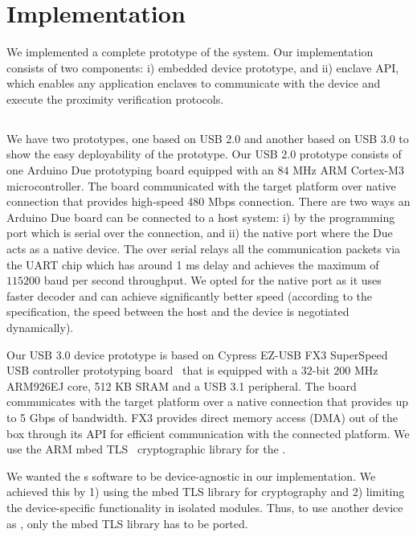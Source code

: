 \section{Implementation}
\label{sec:implementation}

We implemented a complete prototype of the \name system. Our implementation consists of two components: i) \device embedded device prototype, and ii) \name enclave API, which enables any application enclaves to communicate with the \device device and execute the proximity verification protocols.

\subsection{\device}

We have two prototypes, one based on USB 2.0 and another based on USB 3.0 to show the easy deployability of the prototype. Our USB 2.0 \device prototype consists of one Arduino Due prototyping board equipped with an $84$ MHz ARM Cortex-M3 microcontroller. The board communicated with the target platform over native  connection that provides high-speed 480 Mbps connection. There are two ways an Arduino Due board can be connected to a host system: i) by the programming port which is serial over the \usb connection, and ii) the native \usb port where the Due acts as a native \usb device. The \usb over serial relays all the communication packets via the UART chip which has around 1 ms delay and achieves the maximum of $115200$ baud per second throughput. We opted for the native \usb port as it uses faster  decoder and can achieve significantly better speed (according to the \usb specification, the speed between the host and the device is negotiated dynamically).


Our USB 3.0 device prototype is based on Cypress EZ-USB FX3 SuperSpeed USB controller prototyping board~\cite{fx3} that is equipped with a $32$-bit $200$ MHz ARM926EJ core, 512 KB SRAM and a USB 3.1 peripheral. The board communicates with the target platform over a native  connection that provides up to 5 Gbps of bandwidth. FX3 provides direct memory access (DMA) out of the box through its API for efficient communication with the connected platform. We use the ARM mbed TLS~\cite{mbed} cryptographic library for the \tls.

 We wanted the \device{}s software to be device-agnostic in our implementation. We achieved this by 1) using the mbed TLS library for cryptography and 2) limiting the device-specific functionality in isolated modules. Thus, to use another device as \device, only the mbed TLS library has to be ported.


